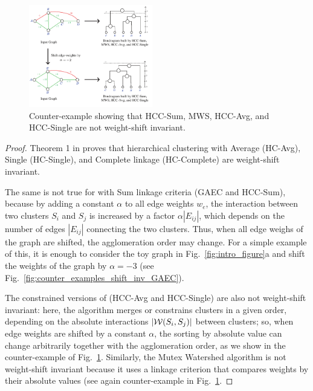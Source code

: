 \begin{figure}[t!]
\centering
\includegraphics[width=0.48\textwidth,trim=0in 0in 0in 0in,clip]{./figures/GASP/counter-examples/counter-example.pdf}

        \caption{ Counter-example showing that HCC-Sum, MWS, HCC-Avg, and HCC-Single are not weight-shift invariant.
        } \label{fig:counter_examples_shift_inv}
\end{figure}

\invariantAlgs*
\begin{proof}
Theorem 1 in \cite{chehreghani2020hierarchical} proves that hierarchical clustering with Average (HC-Avg), Single (HC-Single), and Complete linkage (HC-Complete) are weight-shift invariant.

The same is not true for \algname{} with Sum linkage criteria (GAEC and HCC-Sum), because by adding a constant $\alpha$ to all edge weights $w_e$, the interaction between two clusters $S_i$ and $S_j$ is increased by a factor $\alpha |E_{ij}|$, which depends on the number of edges  $|E_{ij}|$ connecting the two clusters. Thus, when all edge weighs of the graph are shifted, the agglomeration order may change. For a simple example of this, it is enough to consider the toy graph in Fig.~\ref{fig:intro_figure}a and shift the weights of the graph by $\alpha=-3$ (see Fig.~\ref{fig:counter_examples_shift_inv_GAEC}).


The constrained versions of \algname{} (HCC-Avg and HCC-Single) are also not weight-shift invariant: here, the algorithm merges or constrains clusters in a given order, depending on the absolute interactions $|\mathcal{W}{}(S_i, S_j)|$ between clusters; so, when edge weights are shifted by a constant $\alpha$, the sorting by absolute value can change arbitrarily together with the agglomeration order, as we show in the counter-example of Fig.~\ref{fig:counter_examples_shift_inv}.
Similarly, the Mutex Watershed algorithm is not weight-shift invariant because it uses a linkage criterion that compares weights by their absolute values (see again counter-example in Fig.~\ref{fig:counter_examples_shift_inv}.
\end{proof}

